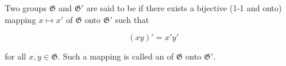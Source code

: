 Two groups $\mathfrak{G}$ and $\mathfrak{G}'$ are said to be  if there exists a bijective (1-1 and onto) mapping $x \mapsto x'$ of $\mathfrak{G}$ onto $\mathfrak{G}'$ such that

$$(xy)' = x'y'$$

for all $x, y \in \mathfrak{G}$. Such a mapping is called an  of $\mathfrak{G}$ onto $\mathfrak{G}'$.
